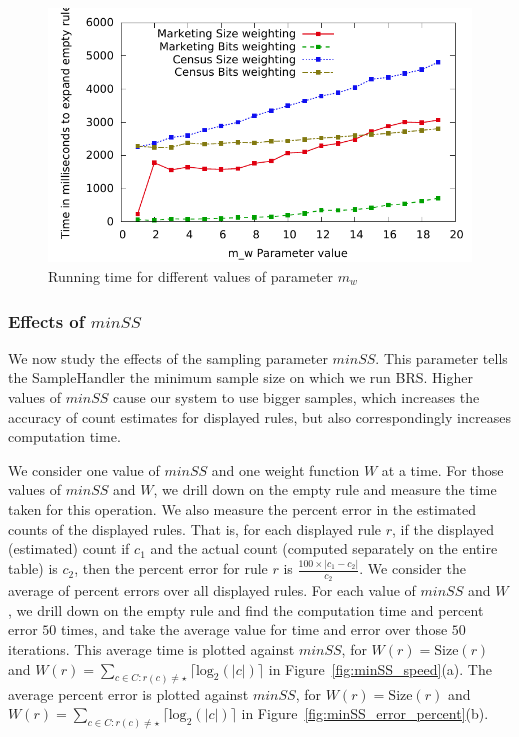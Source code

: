 \begin{figure}
\vspace{-5pt}
\centering
  \includegraphics[scale=0.46]{graphs/mw_speed.pdf}%
\vspace{-10pt}
  \caption{Running time for different values of parameter $m_w$ \label{fig:mw_speed}}
\vspace{-15pt}
\end{figure}

\subsubsection{Effects of $minSS$}
We now study the effects of the sampling parameter $minSS$. This parameter tells the SampleHandler the minimum sample size on which we run BRS. Higher values of $minSS$ cause our system to use bigger samples, which increases the accuracy of count estimates for displayed rules, but also correspondingly increases computation time. 

We consider one value of $minSS$ and one weight function $W$ at a time. For those values of $minSS$ and $W$, we drill down on the empty rule and measure the time taken for this operation. We also measure the percent error in the estimated counts of the displayed rules. That is, for each displayed rule $r$, if the displayed (estimated) count if $c_1$ and the actual count (computed separately on the entire table) is $c_2$, then the percent error for rule $r$ is $\frac{100 \times |c_1-c_2|}{c_2}$. We consider the average of percent errors over all displayed rules. For each value of $minSS$ and $W$, we drill down on the empty rule and find the computation time and percent error $50$ times, and take the average value for time and error over those $50$ iterations. This average time is plotted against $minSS$, for $W(r) = \text{Size}(r)$ and $W(r) = \sum_{c \in C : r(c) \neq \star} \lceil \text{log}_2(|c|) \rceil$ in Figure~\ref{fig:minSS_speed}(a). The average percent error is plotted against $minSS$, for $W(r) = \text{Size}(r)$ and $W(r) = \sum_{c \in C : r(c) \neq \star} \lceil \text{log}_2(|c|) \rceil$ in Figure~\ref{fig:minSS_error_percent}(b). 


